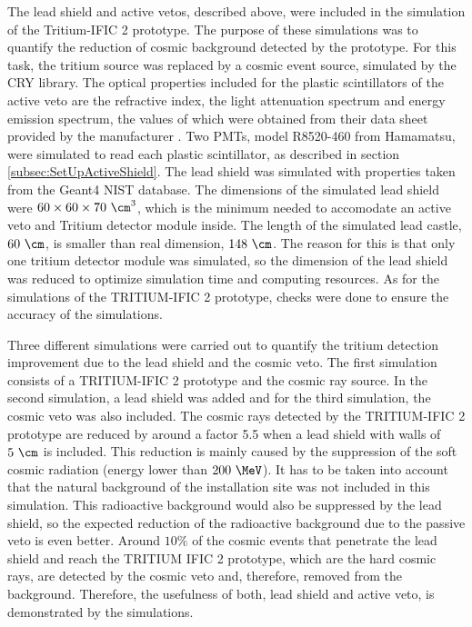 The lead shield and active vetos, described above, were included in the simulation of the Tritium-IFIC 2 prototype. The purpose of these simulations was to quantify the reduction of cosmic background detected by the prototype. For this task, the tritium source was replaced by a cosmic event source, simulated by the CRY library. The optical properties included for the plastic scintillators of the active veto are the refractive index, the light attenuation spectrum and energy emission spectrum, the values of which were obtained from their data sheet provided by the manufacturer \cite{ScintillatorVeto}. Two PMTs, model R8520-460 from Hamamatsu, were simulated to read each plastic scintillator, as described in section \ref{subsec:SetUpActiveShield}. The lead shield was simulated with properties taken from the Geant4 NIST database. The dimensions of the simulated lead shield were $60 \times 60 \times 70~\cm^3$, which is the minimum needed to accomodate an active veto and Tritium detector module inside. The length of the simulated lead castle, $60~\cm$, is smaller than real dimension, $148~\cm$. The reason for this is that only one tritium detector module was simulated, so the dimension of the lead shield was reduced to optimize simulation time and computing resources. As for the simulations of the TRITIUM-IFIC 2 prototype, checks were done to ensure the accuracy of the simulations.

Three different simulations were carried out to quantify the tritium detection improvement due to the lead shield and the cosmic veto. The first simulation consists of a TRITIUM-IFIC 2 prototype and the cosmic ray source. In the second simulation, a lead shield was added and for the third simulation, the cosmic veto was also included. The cosmic rays detected by the TRITIUM-IFIC 2 prototype are reduced by around a factor 5.5 when a lead shield with walls of $5~\cm$ is included. This reduction is mainly caused by the suppression of the soft cosmic radiation (energy lower than $200~\MeV$). It has to be taken into account that the natural background of the installation site was not included in this simulation. This radioactive background would also be suppressed by the lead shield, so the expected reduction of the radioactive background due to the passive veto is even better. Around $10\%$ of the cosmic events that penetrate the lead shield and reach the TRITIUM IFIC 2 prototype, which are the hard cosmic rays, are detected by the cosmic veto and, therefore, removed from the background. Therefore, the usefulness of both, lead shield and active veto, is demonstrated by the simulations.
